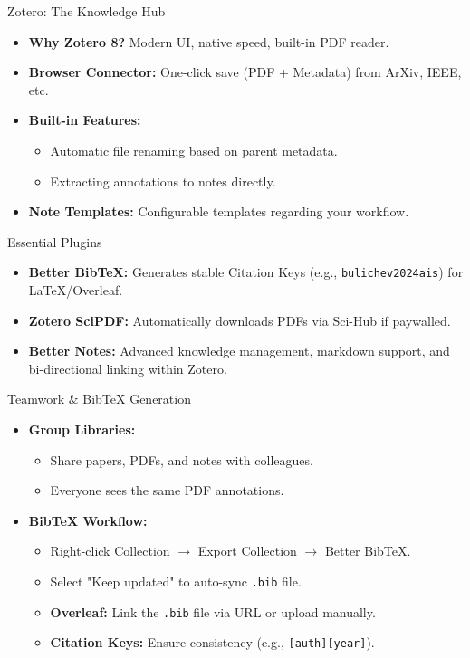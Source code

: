\documentclass[aspectratio=169]{beamer}
\begin{document}
\begin{frame}[t]{Zotero: The Knowledge Hub}
    \begin{itemize}
        \item \textbf{Why Zotero 8?} Modern UI, native speed, built-in PDF reader.
        \item \textbf{Browser Connector:} One-click save (PDF + Metadata) from ArXiv, IEEE, etc.
        \item \textbf{Built-in Features:} 
        \begin{itemize}
            \item Automatic file renaming based on parent metadata.
            \item Extracting annotations to notes directly.
        \end{itemize}
        \item \textbf{Note Templates:} Configurable templates regarding your workflow.
    \end{itemize}
\end{frame}

\begin{frame}[t]{Essential Plugins}
    \begin{itemize}
        \item \textbf{Better BibTeX:} Generates stable Citation Keys (e.g., \texttt{bulichev2024ais}) for LaTeX/Overleaf.
        \item \textbf{Zotero SciPDF:} Automatically downloads PDFs via Sci-Hub if paywalled.
        \item \textbf{Better Notes:} Advanced knowledge management, markdown support, and bi-directional linking within Zotero.
    \end{itemize}
\end{frame}

\begin{frame}[t]{Teamwork \& BibTeX Generation}
    \begin{itemize}
        \item \textbf{Group Libraries:} 
        \begin{itemize}
            \item Share papers, PDFs, and notes with colleagues.
            \item Everyone sees the same PDF annotations.
        \end{itemize}
        \item \textbf{BibTeX Workflow:}
        \begin{itemize}
            \item Right-click Collection $\to$ Export Collection $\to$ Better BibTeX.
            \item Select "Keep updated" to auto-sync \texttt{.bib} file.
            \item \textbf{Overleaf:} Link the \texttt{.bib} file via URL or upload manually.
            \item \textbf{Citation Keys:} Ensure consistency (e.g., \texttt{[auth][year]}).
        \end{itemize}
    \end{itemize}
\end{frame}
\end{document}
